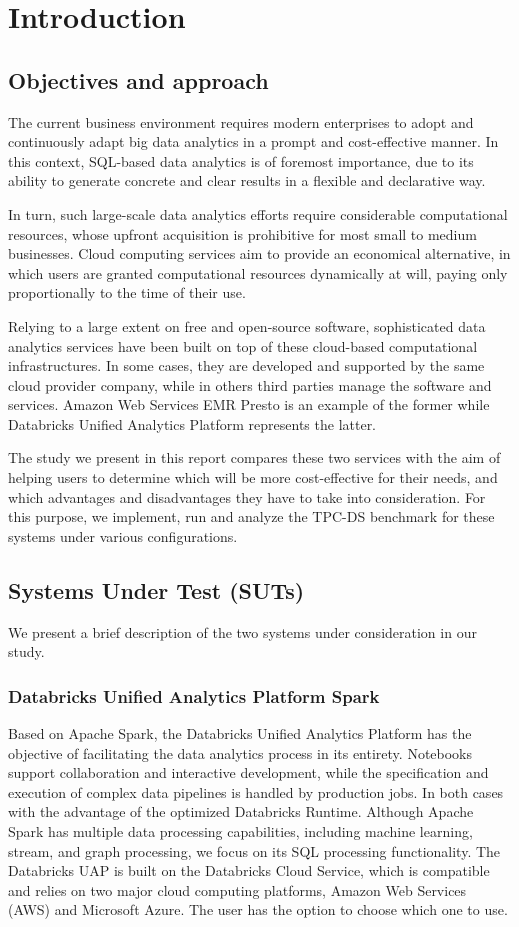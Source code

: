 \section{Introduction}\label{introduction}
\subsection{Objectives and approach}
The current business environment requires modern enterprises to adopt and continuously adapt big data analytics in a prompt and cost-effective manner. In this context, SQL-based data analytics is of foremost importance, due to its ability to generate concrete and clear results in a flexible and declarative way.

In turn, such large-scale data analytics efforts require considerable computational resources, whose upfront acquisition is prohibitive for most small to medium businesses. Cloud computing services aim to provide an economical alternative, in which users are granted computational resources dynamically at will, paying only proportionally to the time of their use.

Relying to a large extent on free and open-source software, sophisticated data analytics services have been built on top of these cloud-based computational infrastructures. In some cases, they are developed and supported by the same cloud provider company, while in others third parties manage the software and services. Amazon Web Services EMR Presto is an example of the former while Databricks Unified Analytics Platform represents the latter.

The study we present in this report compares these two services with the aim of helping users to determine which will be more cost-effective for their needs, and which advantages and disadvantages they have to take into consideration. For this purpose, we implement, run and analyze the TPC-DS benchmark for these systems under various configurations.

\subsection{Systems Under Test (SUTs)}
We present a brief description of the two systems under consideration in our study.

\subsubsection{Databricks Unified Analytics Platform Spark}
Based on Apache Spark, the Databricks Unified Analytics Platform has the objective of facilitating the data analytics process in its entirety. Notebooks support collaboration and interactive development, while the specification and execution of complex data pipelines is handled by production jobs. In both cases with the advantage of the optimized Databricks Runtime. Although Apache Spark has multiple data processing capabilities, including machine learning, stream, and graph processing, we focus on its SQL processing functionality. The Databricks UAP is built on the Databricks Cloud Service, which is compatible and relies on two major cloud computing platforms, Amazon Web Services (AWS) and Microsoft Azure. The user has the option to choose which one to use.

